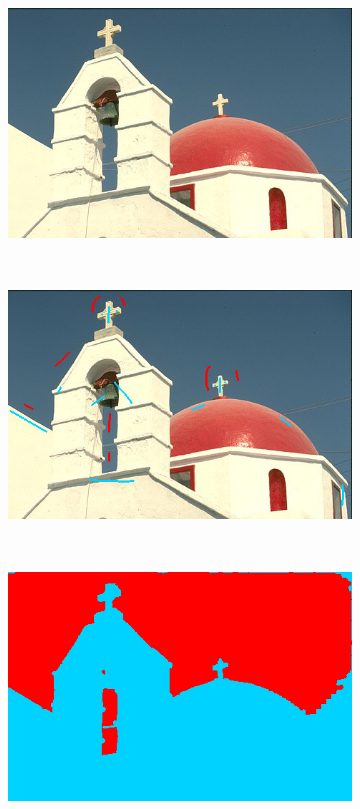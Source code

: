 \begin{figure}[htb]
 \centering
 \begin{subfigure}{0.4\textwidth}	
\includegraphics[width=\textwidth]{images/evaluation/118035.jpg}
 \end{subfigure}
 \\
 \begin{subfigure}{0.4\textwidth}	
\includegraphics[width=\textwidth]{images/evaluation/118035_seeds1.jpg}
 \end{subfigure}
 ~
 \begin{subfigure}{0.4\textwidth}	
\includegraphics[width=\textwidth]{images/evaluation/118035_res1.jpg}

\end{subfigure}
\end{figure}
